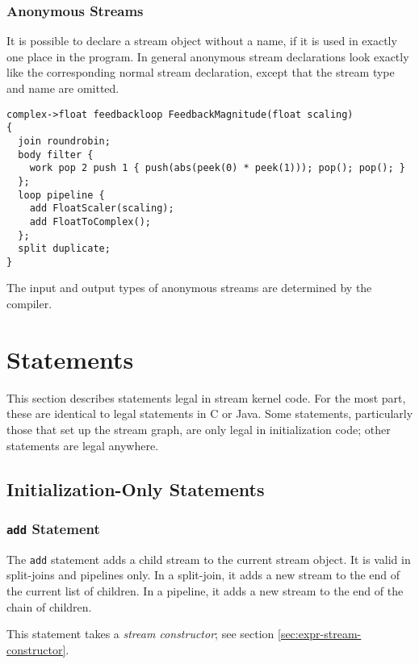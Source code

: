 \documentclass[11pt]{article}
\begin{document}
\subsubsection{Anonymous Streams}
\label{sec:anonymous-streams}

It is possible to declare a stream object without a name, if it is
used in exactly one place in the program.  In general anonymous stream
declarations look exactly like the corresponding normal stream
declaration, except that the stream type and name are omitted.

\begin{verbatim}
complex->float feedbackloop FeedbackMagnitude(float scaling)
{
  join roundrobin;
  body filter {
    work pop 2 push 1 { push(abs(peek(0) * peek(1))); pop(); pop(); }
  };
  loop pipeline {
    add FloatScaler(scaling);
    add FloatToComplex();
  };
  split duplicate;
}
\end{verbatim}

The input and output types of anonymous streams are determined by the
compiler.

\section{Statements}

This section describes statements legal in stream kernel code.  For
the most part, these are identical to legal statements in C or Java.
Some statements, particularly those that set up the stream graph, are
only legal in initialization code; other statements are legal
anywhere.

\subsection{Initialization-Only Statements}

\subsubsection{\texttt{add} Statement}

The \texttt{add} statement adds a child stream to the current stream
object.  It is valid in split-joins and pipelines only.  In a
split-join, it adds a new stream to the end of the current list of
children.  In a pipeline, it adds a new stream to the end of the chain
of children.

This statement takes a \emph{stream constructor}; see section
\ref{sec:expr-stream-constructor}.
\end{document}
